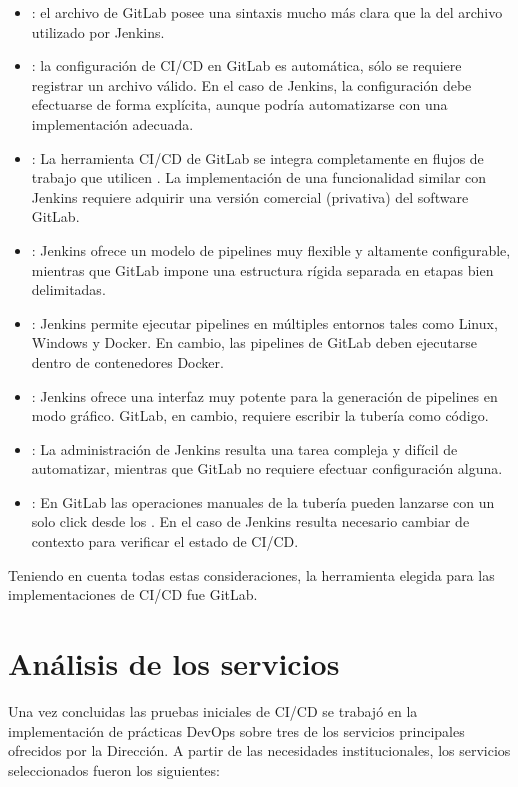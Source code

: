 \begin{itemize}
\item {}: el archivo  de GitLab
  posee una sintaxis mucho más clara que la del archivo
   utilizado por Jenkins.
\item {}: la configuración de CI/CD en GitLab es
  automática, sólo se requiere registrar un archivo
   válido. En el caso de Jenkins, la
  configuración debe efectuarse de forma explícita, aunque podría
  automatizarse con una implementación adecuada.
\item {}: La herramienta CI/CD de GitLab se integra
  completamente en flujos de trabajo que utilicen . La implementación de una funcionalidad similar con
  Jenkins requiere adquirir una versión comercial (privativa) del
  software GitLab.
\item {}: Jenkins ofrece un modelo de pipelines muy
  flexible y altamente configurable, mientras que GitLab impone una
  estructura rígida separada en etapas bien delimitadas.
\item {}: Jenkins permite ejecutar pipelines en
  múltiples entornos tales como Linux, Windows y Docker. En cambio,
  las pipelines de GitLab deben ejecutarse dentro de contenedores
  Docker.
\item {}: Jenkins ofrece una interfaz muy
  potente para la generación de pipelines en modo gráfico. GitLab, en
  cambio, requiere escribir la tubería como código.
\item {}: La administración de Jenkins resulta una
  tarea compleja y difícil de automatizar, mientras que GitLab no
  requiere efectuar configuración alguna.
\item {}: En GitLab las operaciones manuales de la
  tubería pueden lanzarse con un solo click desde los . En el caso de Jenkins resulta necesario cambiar de
  contexto para verificar el estado de CI/CD.
\end{itemize}
Teniendo en cuenta todas estas consideraciones, la herramienta elegida
para las implementaciones de CI/CD fue GitLab.

\section{Análisis de los servicios}

Una vez concluidas las pruebas iniciales de CI/CD se trabajó en la
implementación de prácticas DevOps sobre tres de los servicios
principales ofrecidos por la Dirección. A partir de las necesidades
institucionales, los servicios seleccionados fueron los siguientes:

